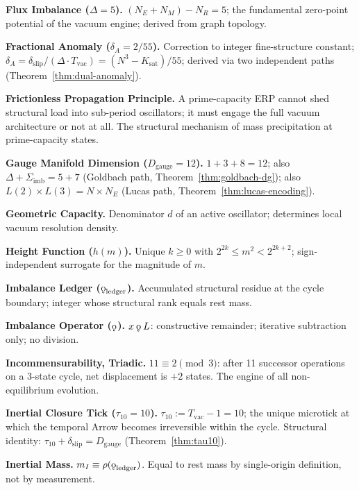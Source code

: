 \documentclass[11pt, letterpaper]{article}
\newcommand{\rank}{\rho}
\newcommand{\koppa}{\mathbin{\text{\rm\k{o}}}}
\newcommand{\Dg}{D_{\mathrm{gauge}}}
\newcommand{\Sigimb}{\Sigma_{\mathrm{imb}}}
\theoremstyle{definition}
\theoremstyle{plain}
\begin{document}
\medskip\noindent\textbf{Flux Imbalance ($\Delta=5$).}
$(N_E+N_M)-N_R=5$; the fundamental zero-point potential of the vacuum engine;
derived from graph topology.

\medskip\noindent\textbf{Fractional Anomaly ($\delta_A=2/55$).}
Correction to integer fine-structure constant; $\delta_A=\delta_{\mathrm{slip}}
/(\Delta\cdot T_{\mathrm{vac}})=(N^3-K_{\mathrm{sat}})/55$; derived via two
independent paths (Theorem~\ref{thm:dual-anomaly}).

\medskip\noindent\textbf{Frictionless Propagation Principle.}
A prime-capacity ERP cannot shed structural load into sub-period oscillators;
it must engage the full vacuum architecture or not at all.  The structural
mechanism of mass precipitation at prime-capacity states.

\medskip\noindent\textbf{Gauge Manifold Dimension ($\Dg=12$).}
$1+3+8=12$; also $\Delta+\Sigimb=5+7$ (Goldbach path, Theorem~\ref{thm:goldbach-dg});
also $L(2)\times L(3)=N\times N_E$ (Lucas path, Theorem~\ref{thm:lucas-encoding}).

\medskip\noindent\textbf{Geometric Capacity.}
Denominator $d$ of an active oscillator; determines local vacuum resolution
density.

\medskip\noindent\textbf{Height Function ($h(m)$).}
Unique $k\geq 0$ with $2^{2k}\leq m^2<2^{2k+2}$; sign-independent surrogate
for the magnitude of $m$.

\medskip\noindent\textbf{Imbalance Ledger ($\koppa_{\mathrm{ledger}}$).}
Accumulated structural residue at the cycle boundary; integer whose structural
rank equals rest mass.

\medskip\noindent\textbf{Imbalance Operator ($\koppa$).}
$x\koppa L$: constructive remainder; iterative subtraction only; no division.

\medskip\noindent\textbf{Incommensurability, Triadic.}
$11\equiv 2\pmod 3$: after 11 successor operations on a 3-state cycle, net
displacement is $+2$ states.  The engine of all non-equilibrium evolution.

\medskip\noindent\textbf{Inertial Closure Tick ($\tau_{10}=10$).}
$\tau_{10}:=T_{\mathrm{vac}}-1=10$; the unique microtick at which the
temporal Arrow becomes irreversible within the cycle.  Structural identity:
$\tau_{10}+\delta_{\mathrm{slip}}=\Dg$ (Theorem~\ref{thm:tau10}).

\medskip\noindent\textbf{Inertial Mass.}
$m_I\equiv\rank(\koppa_{\mathrm{ledger}})$.  Equal to rest mass by
single-origin definition, not by measurement.
\end{document}
